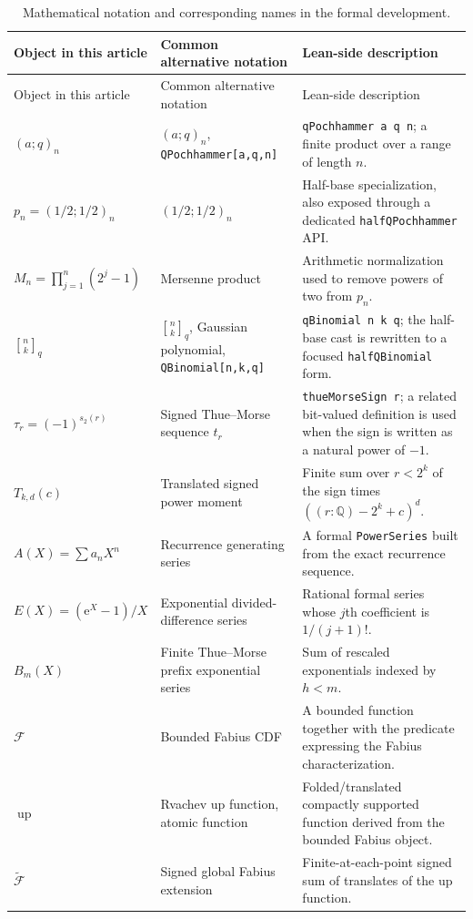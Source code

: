 \documentclass[11pt,oneside]{article}
\theoremstyle{definition}
\theoremstyle{remark}
\newcommand{\qpoch}[3]{\left(#1;#2\right)_{#3}}
\newcommand{\qbinom}[3]{{\genfrac{[}{]}{0pt}{}{#1}{#2}}_{#3}}
\newcommand{\F}{\mathcal F}
\newcommand{\G}{\widetilde{\mathcal F}}
\newcommand{\upfun}{\operatorname{up}}
\newcommand{\Q}{\mathbb Q}
\newcommand{\e}{\mathrm e}
\newcommand{\tm}{\tau}
\begin{document}
\begin{longtable}{@{}L{0.25\textwidth}L{0.25\textwidth}L{0.42\textwidth}@{}}
\caption{Mathematical notation and corresponding names in the formal development.}
\label{p3:tab:notationcrosswalk}\\
\toprule
Object in this article & Common alternative notation & Lean-side description\\
\midrule
\endfirsthead
\toprule
Object in this article & Common alternative notation & Lean-side description\\
\midrule
\endhead
$\qpoch{a}{q}{n}$
& $(a;q)_n$, \texttt{QPochhammer[a,q,n]}
& \texttt{qPochhammer a q n}; a finite product over a range of length $n$.\\[0.35em]
$p_n=\qpoch{1/2}{1/2}{n}$
& $(1/2;1/2)_n$
& Half-base specialization, also exposed through a dedicated
\texttt{halfQPochhammer} API.\\[0.35em]
$M_n=\prod_{j=1}^{n}(2^j-1)$
& Mersenne product
& Arithmetic normalization used to remove powers of two from $p_n$.\\[0.35em]
$\qbinom{n}{k}{q}$
& $\qbinom{n}{k}{q}$, Gaussian polynomial, \texttt{QBinomial[n,k,q]}
& \texttt{qBinomial n k q}; the half-base cast is rewritten to a focused
\texttt{halfQBinomial} form.\\[0.35em]
$\tm_r=(-1)^{s_2(r)}$
& Signed Thue--Morse sequence $t_r$
& \texttt{thueMorseSign r}; a related bit-valued definition is used when the
sign is written as a natural power of $-1$.\\[0.35em]
$T_{k,d}(c)$
& Translated signed power moment
& Finite sum over $r<2^k$ of the sign times
$((r:\Q)-2^k+c)^d$.\\[0.35em]
$A(X)=\sum a_nX^n$
& Recurrence generating series
& A formal \texttt{PowerSeries} built from the exact recurrence sequence.\\[0.35em]
$E(X)=(\e^X-1)/X$
& Exponential divided-difference series
& Rational formal series whose $j$th coefficient is $1/(j+1)!$.\\[0.35em]
$B_m(X)$
& Finite Thue--Morse prefix exponential series
& Sum of rescaled exponentials indexed by $h<m$.\\[0.35em]
$\F$
& Bounded Fabius CDF
& A bounded function together with the predicate expressing the Fabius
characterization.\\[0.35em]
$\upfun$
& Rvachev up function, atomic function
& Folded/translated compactly supported function derived from the bounded
Fabius object.\\[0.35em]
$\G$
& Signed global Fabius extension
& Finite-at-each-point signed sum of translates of the up function.\\
\bottomrule
\end{longtable}
\end{document}
